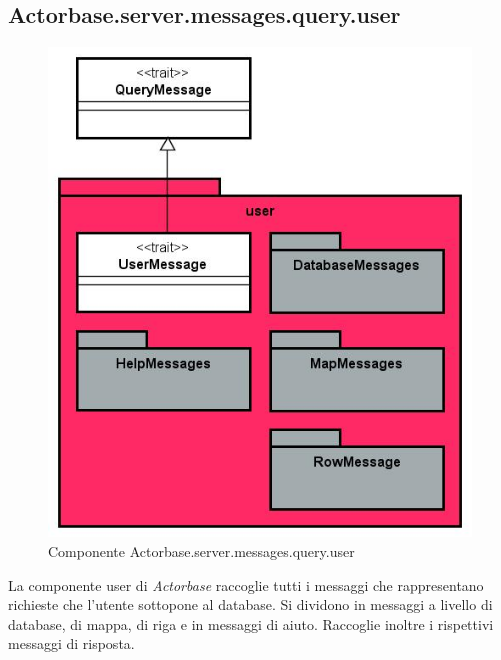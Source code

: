 \documentclass[a4paper]{article}
\begin{document}
		\subsection{Actorbase.server.messages.query.user}
		\begin{figure}[H]
			\centering
			\includegraphics[scale=0.5]{Server/userLevel.jpg}
			\caption{Componente Actorbase.server.messages.query.user}
		\end{figure}
		La componente user di \emph{Actorbase} raccoglie tutti i messaggi che rappresentano richieste che l'utente sottopone al database. Si dividono in messaggi a livello di database, di mappa, di riga e in messaggi di aiuto. Raccoglie inoltre i rispettivi messaggi di risposta.
		
\end{document}
